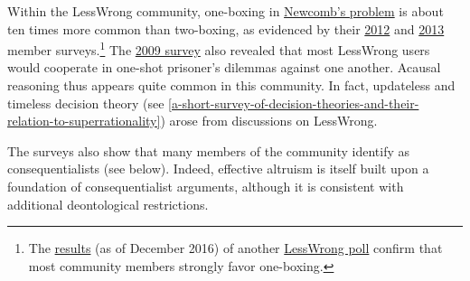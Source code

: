 Within the LessWrong community, one-boxing in
\href{https://en.wikipedia.org/wiki/Newcomb\%27s_paradox}{Newcomb's
problem} is about ten times more common than two-boxing, as evidenced
by their
\href{http://lesswrong.com/lw/fp5/2012_survey_results/}{2012} and
\href{http://lesswrong.com/lw/jj0/2013_survey_results/}{2013}
member surveys.\footnote{The
  \href{https://casparoesterheld.files.wordpress.com/2016/12/newcombpayoffratiosurveydec2016.jpeg}{results}
  (as of December 2016) of another
  \href{http://lesswrong.com/r/discussion/lw/hpy/normative_uncertainty_in_newcombs_problem/969i}{LessWrong
  poll} confirm that most community members strongly favor one-boxing.}
The \href{http://lesswrong.com/lw/fk/survey_results/}{2009
survey} also revealed that most LessWrong users would cooperate in
one-shot prisoner's dilemmas against one another. Acausal reasoning thus
appears quite common in this community. In fact, updateless and timeless
decision theory (see
\ref{a-short-survey-of-decision-theories-and-their-relation-to-superrationality}) arose from discussions on LessWrong.

The surveys also show that many members of the community identify as
consequentialists (see below). Indeed, effective altruism is itself
built upon a foundation of consequentialist arguments, although it is
consistent with additional deontological restrictions.

